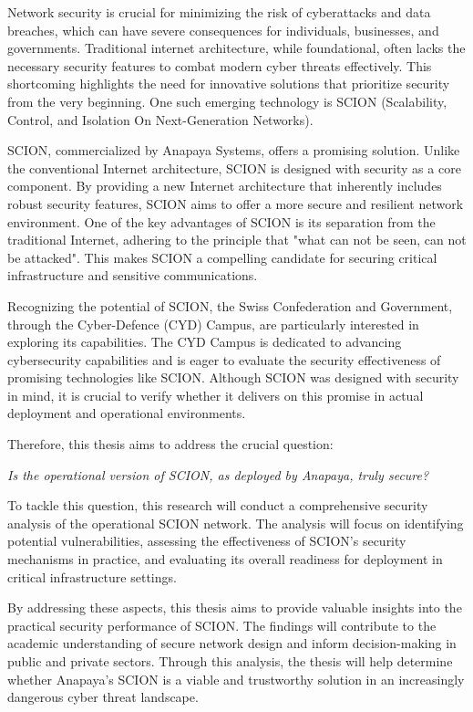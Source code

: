 Network security is crucial for minimizing the risk of cyberattacks and data breaches, which can have severe consequences for individuals, businesses, and governments.
Traditional internet architecture, while foundational, often lacks the necessary security features to combat modern cyber threats effectively.
This shortcoming highlights the need for innovative solutions that prioritize security from the very beginning.
One such emerging technology is SCION (Scalability, Control, and Isolation On Next-Generation Networks).

SCION, commercialized by Anapaya Systems, offers a promising solution.
Unlike the conventional Internet architecture, SCION is designed with security as a core component.
By providing a new Internet architecture that inherently includes robust security features, SCION aims to offer a more secure and resilient network environment.
One of the key advantages of SCION is its separation from the traditional Internet, adhering to the principle that "what can not be seen, can not be attacked".
This makes SCION a compelling candidate for securing critical infrastructure and sensitive communications.

Recognizing the potential of SCION, the Swiss Confederation and Government, through the Cyber-Defence (CYD) Campus, are particularly interested in exploring its capabilities.
The CYD Campus is dedicated to advancing cybersecurity capabilities and is eager to evaluate the security effectiveness of promising technologies like SCION.
Although SCION was designed with security in mind, it is crucial to verify whether it delivers on this promise in actual deployment and operational environments.

Therefore, this thesis aims to address the crucial question:
\begin{center}
    \textit{Is the operational version of SCION, as deployed by Anapaya, truly secure?}
\end{center}

To tackle this question, this research will conduct a comprehensive security analysis of the operational SCION network.
The analysis will focus on identifying potential vulnerabilities, assessing the effectiveness of SCION's security mechanisms in practice, and evaluating its overall readiness for deployment in critical infrastructure settings.

By addressing these aspects, this thesis aims to provide valuable insights into the practical security performance of SCION.
The findings will contribute to the academic understanding of secure network design and inform decision-making in public and private sectors.
Through this analysis, the thesis will help determine whether Anapaya's SCION is a viable and trustworthy solution in an increasingly dangerous cyber threat landscape.


